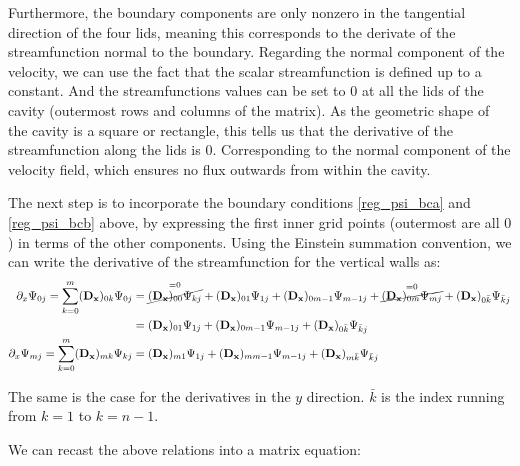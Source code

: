 Furthermore, the boundary components are only nonzero in the tangential
direction of the four lids, meaning this corresponds to the derivate of the
streamfunction normal to the boundary. Regarding the normal component of the
velocity, we can use the fact that the scalar streamfunction is defined up to a
constant. And the streamfunctions values can be set to $0$ at all the lids of
the cavity (outermost rows and columns of the matrix). As the geometric shape
of the cavity is a square or rectangle, this tells us that the derivative of
the streamfunction along the lids is $0$. Corresponding to the normal component
of the velocity field, which ensures no flux outwards from within the cavity.

The next step is to incorporate the boundary conditions \eqref{reg_psi_bca} and
\eqref{reg_psi_bcb} above, by expressing the first inner grid points (outermost
are all $0$) in terms of the other components. Using the Einstein summation
convention, we can write the derivative of the streamfunction for the
vertical walls as:
\begin{align}
\partial_x \Psi_{0j} = \sum_{k=0}^{m} (\mathbf{D_x})_{0k} \Psi_{0j}
  &= \overset{=0}{\cancel{(\mathbf{D_x})_{00}\Psi_{kj}}} + (\mathbf{D_x})_{01}\Psi_{1j} 
  + (\mathbf{D_x})_{0m-1}\Psi_{m-1j} +  \overset{=0}{\cancel{(\mathbf{D_x})_{0m}\Psi_{mj}}}
  + (\mathbf{D_x})_{0\bar{k}}\Psi_{\bar{k}j} \nonumber \\
  &= (\mathbf{D_x})_{01}\Psi_{1j} + (\mathbf{D_x})_{0m-1}\Psi_{m-1j}
  + (\mathbf{D_x})_{0\bar{k}}\Psi_{\bar{k}j} \\
\partial_x \Psi_{mj} = \sum_{k=0}^{m} (\mathbf{D_x})_{mk} \Psi_{kj}
  &= (\mathbf{D_x})_{m1}\Psi_{1j} + (\mathbf{D_x})_{mm-1}\Psi_{m-1j} 
  + (\mathbf{D_x})_{m\bar{k}}\Psi_{\bar{k}j}
\end{align}

The same is the case for the derivatives in the $y$ direction. $\bar{k}$ is the
index running from $k=1$ to $k=n-1$.

We can recast the above relations into a matrix equation:

